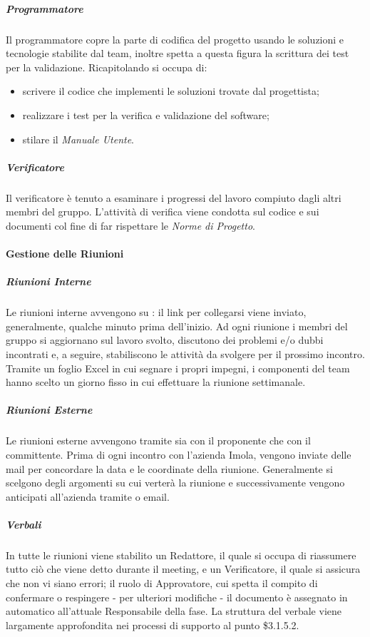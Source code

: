 \subparagraph*{Programmatore} \hfill \break
Il programmatore copre la parte di codifica del progetto usando le soluzioni e tecnologie stabilite dal team, inoltre
spetta a questa figura la scrittura dei test per la validazione. Ricapitolando si occupa di:
\begin{itemize}
    \item scrivere il codice che implementi le soluzioni trovate dal progettista;
    \item realizzare i test per la verifica e validazione del software;
    \item stilare il \emph{Manuale Utente}.
\end{itemize}

\subparagraph*{Verificatore} \hfill \break
Il verificatore è tenuto a esaminare i progressi del lavoro compiuto dagli altri membri del gruppo.   
L'attività di verifica viene condotta sul codice e sui documenti col fine di far rispettare le \emph{Norme di Progetto}.

\paragraph{Gestione delle Riunioni}
\subparagraph*{Riunioni Interne} \hfill \break
Le riunioni interne avvengono su : il link per collegarsi viene inviato, generalmente, 
qualche minuto prima dell'inizio. Ad ogni riunione i membri del gruppo si aggiornano sul lavoro svolto, discutono dei problemi e/o dubbi incontrati 
e, a seguire, stabiliscono le attività da svolgere per il prossimo incontro. Tramite un foglio Excel in cui segnare i propri impegni, 
i componenti del team hanno scelto un giorno fisso in cui effettuare la riunione settimanale.

\subparagraph*{Riunioni Esterne} \hfill \break
Le riunioni esterne avvengono tramite  sia con il proponente che con il committente. Prima di ogni incontro con 
l'azienda Imola, vengono inviate delle mail per concordare la data e le coordinate della riunione. Generalmente si scelgono
degli argomenti su cui verterà la riunione e successivamente vengono anticipati all'azienda tramite  o email.

\subparagraph*{Verbali} \hfill \break
In tutte le riunioni viene stabilito un Redattore, il quale si occupa di riassumere tutto ciò che
viene detto durante il meeting, e un Verificatore, il quale si assicura che non vi siano errori; 
il ruolo di Approvatore, cui spetta il compito di confermare o respingere - per ulteriori modifiche - il 
documento è assegnato in automatico all'attuale Responsabile della fase. La struttura del verbale viene 
largamente approfondita nei processi di supporto al punto \$3.1.5.2.

